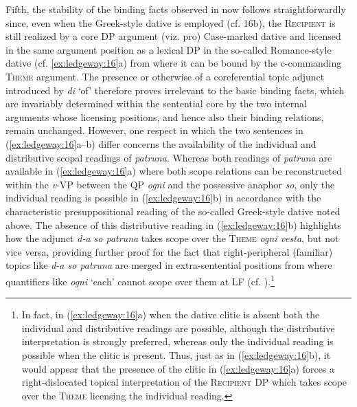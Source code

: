 \documentclass[output=paper,modfonts,nonflat,colorlinks,citecolor=brown]{langsci/langscibook}
\begin{document}
  Fifth, the stability of the binding facts observed in  now follows straightforwardly since, even when the Greek-style dative is employed (cf. 16b), the \textsc{Recipient} is still realized by a core DP argument (viz. pro) Case-marked dative and licensed in the same argument position as a lexical DP in the so-called Romance-style dative (cf. \ref{ex:ledgeway:16}a) from where it can be bound by the c-commanding \textsc{Theme} argument. The presence or otherwise of a coreferential topic adjunct introduced by \textit{di} ‘of’ therefore proves irrelevant to the basic binding facts, which are invariably determined within the sentential core by the two internal arguments whose licensing positions, and hence also their binding relations, remain unchanged. However, one respect in which the two sentences in (\ref{ex:ledgeway:16}a--b) differ concerns the availability of the individual and distributive scopal readings of \textit{patruna}. Whereas both readings of \textit{patruna} are available in (\ref{ex:ledgeway:16}a) where both scope relations can be reconstructed within the \textit{v}{}-VP between the QP \textit{ogni} and the possessive anaphor \textit{so}, only the individual reading is possible in (\ref{ex:ledgeway:16}b) in accordance with the characteristic presuppositional reading of the so-called Greek-style dative noted above. The absence of this distributive reading in (\ref{ex:ledgeway:16}b) highlights how the adjunct \textit{d-a so patruna} takes scope over the \textsc{Theme} \textit{ogni vesta}, but not vice versa, providing further proof for the fact that right-peripheral (familiar) topics like \textit{d-a so patruna} are merged in extra-sentential positions from where quantifiers like \textit{ogni} ‘each’ cannot scope over them at LF (cf. \citealt{Cardinaletti2002, Frascarelli2004, FrascarelliHinterhölzl2007}).\footnote{In fact, in (\ref{ex:ledgeway:16}a) when the dative clitic is absent both the individual and distributive readings are possible, although the distributive interpretation is strongly preferred, whereas only the individual reading is possible when the clitic is present. Thus, just as in (\ref{ex:ledgeway:16}b), it would appear that the presence of the clitic in (\ref{ex:ledgeway:16}a) forces a right-dislocated topical interpretation of the \textsc{Recipient} DP which takes scope over the \textsc{Theme} licensing the individual reading.}
\end{document}
